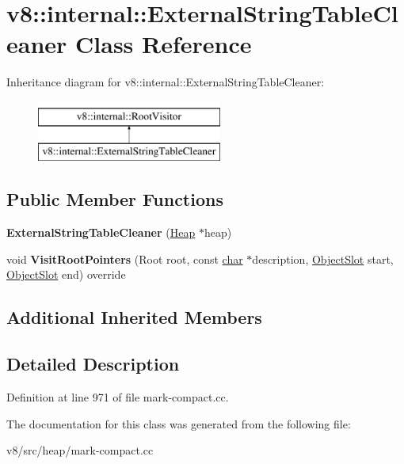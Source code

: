 \hypertarget{classv8_1_1internal_1_1ExternalStringTableCleaner}{}\section{v8\+:\+:internal\+:\+:External\+String\+Table\+Cleaner Class Reference}
\label{classv8_1_1internal_1_1ExternalStringTableCleaner}
Inheritance diagram for v8\+:\+:internal\+:\+:External\+String\+Table\+Cleaner\+:\begin{figure}[H]
\begin{center}
\leavevmode
\includegraphics[height=2.000000cm]{classv8_1_1internal_1_1ExternalStringTableCleaner}
\end{center}
\end{figure}
\subsection*{Public Member Functions}
\begin{DoxyCompactItemize}
\item 
\mbox{\label{classv8_1_1internal_1_1ExternalStringTableCleaner_a4aceae96c0bda70b0319790871ff848f}} 
{\bfseries External\+String\+Table\+Cleaner} (\mbox{\hyperlink{classv8_1_1internal_1_1Heap}{Heap}} $\ast$heap)
\item 
\mbox{\label{classv8_1_1internal_1_1ExternalStringTableCleaner_a98cbece5929de5c665de5807a2f5c892}} 
void {\bfseries Visit\+Root\+Pointers} (Root root, const \mbox{\hyperlink{classchar}{char}} $\ast$description, \mbox{\hyperlink{classv8_1_1internal_1_1ObjectSlot}{Object\+Slot}} start, \mbox{\hyperlink{classv8_1_1internal_1_1ObjectSlot}{Object\+Slot}} end) override
\end{DoxyCompactItemize}
\subsection*{Additional Inherited Members}


\subsection{Detailed Description}


Definition at line 971 of file mark-\/compact.\+cc.



The documentation for this class was generated from the following file\+:\begin{DoxyCompactItemize}
\item 
v8/src/heap/mark-\/compact.\+cc\end{DoxyCompactItemize}
